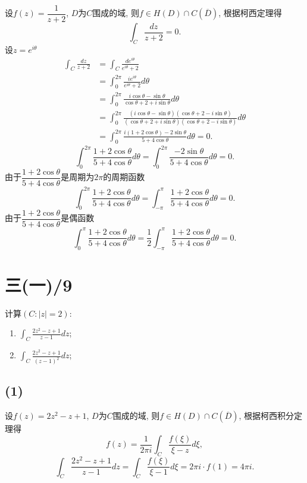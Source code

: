 \documentclass[11pt,a4paper]{article}
\begin{document}
设$f(z)=\dfrac{1}{z+2}$, $D$为$C$围成的域, 则$f\in H(D)\cap C(\overline{D})$, 根据柯西定理得
$$\int_C\frac{dz}{z+2}=0.$$
设$z=e^{i\theta}$
\begin{align*}
  \int_C\frac{dz}{z+2}
   & =\int_C\frac{de^{i\theta}}{e^{i\theta}+2}                                                                                            \\
   & =\int_0^{2\pi}\frac{ie^{i\theta}}{e^{i\theta}+2}d\theta                                                                              \\
   & =\int_0^{2\pi}\frac{i\cos\theta-\sin\theta}{\cos\theta+2+i\sin\theta}d\theta                                                         \\
   & =\int_0^{2\pi}\frac{(i\cos\theta-\sin\theta)(\cos\theta+2-i\sin\theta)}{(\cos\theta+2+i\sin\theta)(\cos\theta+2-i\sin\theta)}d\theta \\
   & =\int_0^{2\pi}\frac{i(1+2\cos\theta)-2\sin\theta}{5+4\cos\theta}d\theta=0.
\end{align*}
$$\int_0^{2\pi}\frac{1+2\cos\theta}{5+4\cos\theta}d\theta=\int_0^{2\pi}\frac{-2\sin\theta}{5+4\cos\theta}d\theta=0.$$
由于$\dfrac{1+2\cos\theta}{5+4\cos\theta}$是周期为$2\pi$的周期函数
$$\int_0^{2\pi}\frac{1+2\cos\theta}{5+4\cos\theta}d\theta=\int_{-\pi}^{\pi}\frac{1+2\cos\theta}{5+4\cos\theta}d\theta=0.$$
由于$\dfrac{1+2\cos\theta}{5+4\cos\theta}$是偶函数
$$\int_0^{\pi}\frac{1+2\cos\theta}{5+4\cos\theta}d\theta=\frac{1}{2}\int_{-\pi}^{\pi}\frac{1+2\cos\theta}{5+4\cos\theta}d\theta=0.$$

\section{三(一)/9}
\begin{problem}
计算$(C:|z|=2)$:
\begin{enumerate}
  \item $\displaystyle\int_C\frac{2z^2-z+1}{z-1}dz$;
  \item $\displaystyle\int_C\frac{2z^2-z+1}{(z-1)^2}dz$;
\end{enumerate}
\end{problem}

\subsection*{(1)}
设$f(z)=2z^2-z+1$, $D$为$C$围成的域, 则$f\in H(D)\cap C(\overline{D})$, 根据柯西积分定理得
$$f(z)=\frac{1}{2\pi i}\int_C\frac{f(\xi)}{\xi-z}d\xi,$$
$$\int_C\frac{2z^2-z+1}{z-1}dz=\int_C\frac{f(\xi)}{\xi-1}d\xi=2\pi i\cdot f(1)=4\pi i.$$
\end{document}
